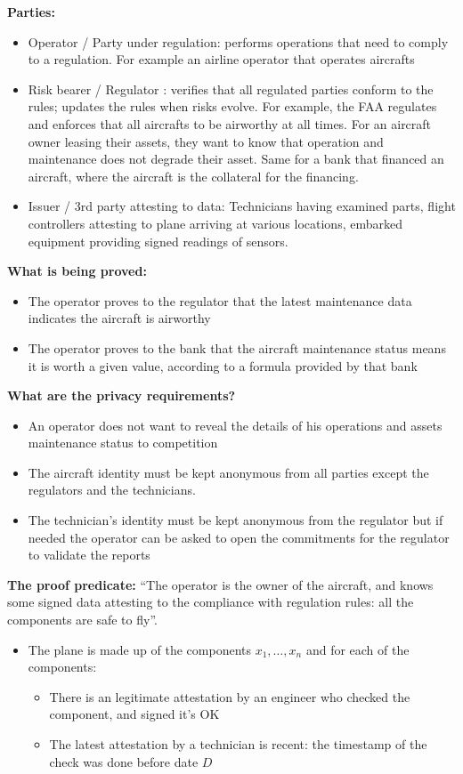 \textbf{Parties:} 
\begin{itemize}
    \item Operator / Party under regulation: performs operations that need to comply to a regulation. For example an airline operator that operates aircrafts
    \item Risk bearer / Regulator : verifies that all regulated parties conform to the rules; updates the rules when risks evolve. For example, the FAA regulates and enforces that all aircrafts to be airworthy at all times. For an aircraft owner leasing their assets, they want to know that operation and maintenance does not degrade their asset. Same for a bank that financed an aircraft, where the aircraft is the collateral for the financing.  
    \item Issuer / 3rd party attesting to data: Technicians having examined parts, flight controllers attesting to plane arriving at various locations, embarked equipment providing signed readings of sensors.
\end{itemize}

\textbf{What is being proved:}
\begin{itemize}
    \item The operator proves to the regulator that the latest maintenance data indicates the aircraft is airworthy
    \item The operator proves to the bank that the aircraft maintenance status means it is worth a given value, according to a formula provided by that bank
\end{itemize}

\textbf{What are the privacy requirements?}
\begin{itemize}
    \item An operator does not want to reveal the details of his operations and assets maintenance status to competition
    \item The aircraft identity must be kept anonymous from all parties except the regulators and the technicians.
    \item The technician’s identity must be kept anonymous from the regulator but if needed the operator can be asked to open the commitments for the regulator to validate the reports
\end{itemize}
 
\textbf{The proof predicate:} “The operator is the owner of the aircraft, and knows some signed data attesting to the compliance with regulation rules: all the components are safe to fly”. 
	\begin{itemize}
     \item The plane is made up of the components $x_1, \ldots, x_n$ and for each of the components: 
				\begin{itemize}
            \item There is an legitimate attestation by an engineer who checked the component, and signed it's OK
            \item The latest attestation by a technician is recent: the timestamp of the check was done before date $D$
				\end{itemize}
	\end{itemize}



